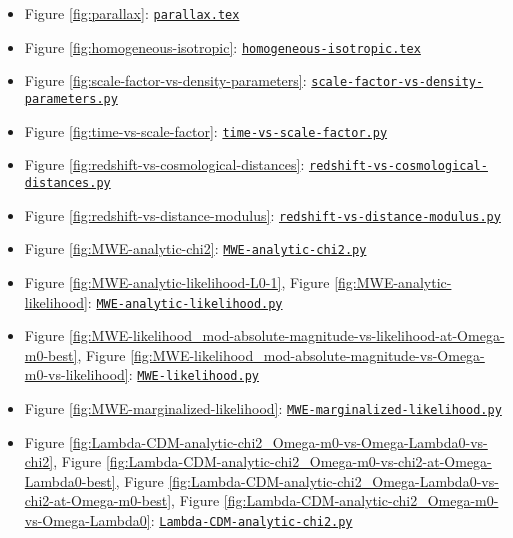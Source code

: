 \begin{appendix}
\begin{itemize}
    \item Figure \ref{fig:parallax}: \href{https://github.com/DaHaCoder/bachelor-thesis/blob/main/thesis/figures/tikz/parallax/parallax.tex}{\lstinline{parallax.tex}}
    \item Figure \ref{fig:homogeneous-isotropic}: \href{https://github.com/DaHaCoder/bachelor-thesis/blob/main/thesis/figures/tikz/homogeneous-isotropic/homogeneous-isotropic.tex}{\lstinline{homogeneous-isotropic.tex}}
    \item Figure \ref{fig:scale-factor-vs-density-parameters}: \href{https://github.com/DaHaCoder/bachelor-thesis/blob/main/code/scale-factor-vs-density-parameters.py}{\lstinline{scale-factor-vs-density-parameters.py}}
    \item Figure \ref{fig:time-vs-scale-factor}: \href{https://github.com/DaHaCoder/bachelor-thesis/blob/main/code/time-vs-scale-factor.py}{\lstinline{time-vs-scale-factor.py}}
    \item Figure \ref{fig:redshift-vs-cosmological-distances}: \href{https://github.com/DaHaCoder/bachelor-thesis/blob/main/code/redshift-vs-cosmological-distances.py}{\lstinline{redshift-vs-cosmological-distances.py}}
    \item Figure \ref{fig:redshift-vs-distance-modulus}: \href{https://github.com/DaHaCoder/bachelor-thesis/blob/main/code/redshift-vs-distance-modulus.py}{\lstinline{redshift-vs-distance-modulus.py}}
    \item Figure \ref{fig:MWE-analytic-chi2}: \href{https://github.com/DaHaCoder/bachelor-thesis/blob/main/code/MWE-analytic-chi2.py}{\lstinline{MWE-analytic-chi2.py}}
    \item Figure \ref{fig:MWE-analytic-likelihood-L0-1}, Figure \ref{fig:MWE-analytic-likelihood}: \href{https://github.com/DaHaCoder/bachelor-thesis/blob/main/code/MWE-analytic-likelihood.py}{\lstinline{MWE-analytic-likelihood.py}}
    \item Figure \ref{fig:MWE-likelihood_mod-absolute-magnitude-vs-likelihood-at-Omega-m0-best}, Figure \ref{fig:MWE-likelihood_mod-absolute-magnitude-vs-Omega-m0-vs-likelihood}: \href{https://github.com/DaHaCoder/bachelor-thesis/blob/main/code/MWE-likelihood.py}{\lstinline{MWE-likelihood.py}}
    \item Figure \ref{fig:MWE-marginalized-likelihood}: \href{https://github.com/DaHaCoder/bachelor-thesis/blob/main/code/MWE-marginalized-likelihood.py}{\lstinline{MWE-marginalized-likelihood.py}}
    \item Figure \ref{fig:Lambda-CDM-analytic-chi2_Omega-m0-vs-Omega-Lambda0-vs-chi2}, Figure \ref{fig:Lambda-CDM-analytic-chi2_Omega-m0-vs-chi2-at-Omega-Lambda0-best}, Figure \ref{fig:Lambda-CDM-analytic-chi2_Omega-Lambda0-vs-chi2-at-Omega-m0-best}, Figure \ref{fig:Lambda-CDM-analytic-chi2_Omega-m0-vs-Omega-Lambda0}: \href{https://github.com/DaHaCoder/bachelor-thesis/blob/main/code/Lambda-CDM-analytic-chi2.py}{\lstinline{Lambda-CDM-analytic-chi2.py}}

\end{itemize}
\end{appendix}
